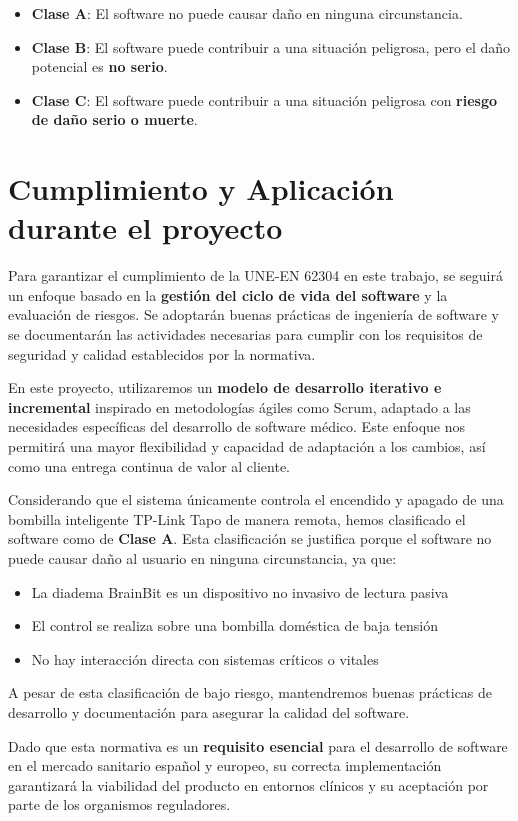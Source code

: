 \begin{itemize}
    \item \textbf{Clase A}: El software no puede causar daño en ninguna circunstancia.
    \item \textbf{Clase B}: El software puede contribuir a una situación peligrosa, pero el daño potencial es \textbf{no serio}.
    \item \textbf{Clase C}: El software puede contribuir a una situación peligrosa con \textbf{riesgo de daño serio o muerte}.
\end{itemize}

\section{Cumplimiento y Aplicación durante el proyecto}
Para garantizar el cumplimiento de la UNE-EN 62304 \cite{UNE-EN-62304} en este trabajo, se seguirá un enfoque basado en la \textbf{gestión del ciclo de vida del software} y la evaluación de riesgos. Se adoptarán buenas prácticas de ingeniería de software y se documentarán las actividades necesarias para cumplir con los requisitos de seguridad y calidad establecidos por la normativa.

En este proyecto, utilizaremos un \textbf{modelo de desarrollo iterativo e incremental} inspirado en metodologías ágiles como Scrum, adaptado a las necesidades específicas del desarrollo de software médico. Este enfoque nos permitirá una mayor flexibilidad y capacidad de adaptación a los cambios, así como una entrega continua de valor al cliente.

Considerando que el sistema únicamente controla el encendido y apagado de una bombilla inteligente TP-Link Tapo de manera remota, hemos clasificado el software como de \textbf{Clase A}. Esta clasificación se justifica porque el software no puede causar daño al usuario en ninguna circunstancia, ya que:
\begin{itemize}
    \item La diadema BrainBit es un dispositivo no invasivo de lectura pasiva
    \item El control se realiza sobre una bombilla doméstica de baja tensión
    \item No hay interacción directa con sistemas críticos o vitales
\end{itemize}

A pesar de esta clasificación de bajo riesgo, mantendremos buenas prácticas de desarrollo y documentación para asegurar la calidad del software.

Dado que esta normativa es un \textbf{requisito esencial} para el desarrollo de software en el mercado sanitario español y europeo, su correcta implementación garantizará la viabilidad del producto en entornos clínicos y su aceptación por parte de los organismos reguladores.